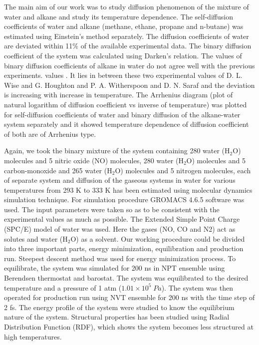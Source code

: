   The main aim of our work was to study diffusion phenomenon of the mixture of water and alkane and study its temperature dependence. The self-diffusion coefficients of water and alkane (methane, ethane, propane and n-butane) was estimated using Einstein's method  separately. The diffusion coefficients of water are deviated within 11$\%$ of the available experimental data. The binary  diffusion coefficient of the system was calculated using Darken's relation. The values of binary diffusion coefficients of alkane in water do not agree well with the  previous  experiments. values . It lies in between these two experimental values of D. L. Wise and G. Houghton and  P. A. Witherspoon and D. N.
Saraf and the deviation is increasing with increase in temperature. The Arrhenius diagram (plot of natural logarithm of diffusion coefficient vs inverse of temperature) was plotted for self-diffusion coefficients of water and binary diffusion of the alkane-water system  separately and it showed temperature dependence of diffusion coefficient of both are of Arrhenius type.

Again, we took the binary mixture of the system containing 280 water (H$_\mathrm{2}$O) molecules and 5 nitric oxide (NO) molecules,  280 water (H$_\mathrm{2}$O) molecules and 5  carbon-monoxide and 265 water (H$_\mathrm{2}$O) molecules and 5 nitrogen molecules, each of separate system and   diffusion
of the gaseous systems  in water for various temperatures from 293 K to 333 K   has been estimated using molecular dynamics simulation technique. For simulation procedure GROMACS 4.6.5 software was used. The input parameters were taken so as to be consistent with the experimental values as much as possible. The Extended Simple Point Charge (SPC/E)  model of water was used. Here the gases (NO, CO  and N2)  act as  solutes and water (H$_\mathrm{2}$O) as a solvent. Our working procedure could be divided into three important parts, energy minimization, equilibration and production run. Steepest descent method was used for energy minimization process. To equilibrate, the system was simulated for 200 ns in NPT ensemble using Berendsen thermostat and barostat. The system was equilibrated to the desired temperature and a pressure of 1 atm ($1.01\times10^5\; Pa$). The system was then operated for production run using NVT ensemble for 200 ns with the time step of 2 fs. The energy profile of the system were studied to know the equilibrium nature of the system. Structural properties has been studied using Radial Distribution Function (RDF), which shows the system becomes less structured at high temperatures. 

